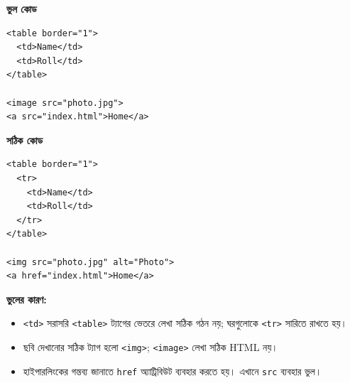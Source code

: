 \noindent
\begin{minipage}[t]{.48\linewidth}\vspace{0pt}
\textbf{\color{chFourRose}ভুল কোড}\par
\begin{verbatim}
<table border="1">
  <td>Name</td>
  <td>Roll</td>
</table>

<image src="photo.jpg">
<a src="index.html">Home</a>
\end{verbatim}
\end{minipage}\hfill
\begin{minipage}[t]{.48\linewidth}\vspace{0pt}
\textbf{\color{chFourTeal}সঠিক কোড}\par
\begin{verbatim}
<table border="1">
  <tr>
    <td>Name</td>
    <td>Roll</td>
  </tr>
</table>

<img src="photo.jpg" alt="Photo">
<a href="index.html">Home</a>
\end{verbatim}
\end{minipage}
\par\smallskip
\textbf{ভুলের কারণ:}
\begin{itemize}
\item \texttt{<td>} সরাসরি \texttt{<table>} ট্যাগের ভেতরে লেখা সঠিক গঠন নয়; ঘরগুলোকে \texttt{<tr>} সারিতে রাখতে হয়।
\item ছবি দেখানোর সঠিক ট্যাগ হলো \texttt{<img>}; \texttt{<image>} লেখা সঠিক HTML নয়।
\item হাইপারলিংকের গন্তব্য জানাতে \texttt{href} অ্যাট্রিবিউট ব্যবহার করতে হয়। এখানে \texttt{src} ব্যবহার ভুল।
\end{itemize}



